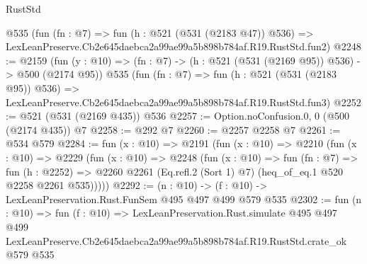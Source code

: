 \begin{lexlean}{RustStd}
\begin{coremodule}
    @535
    (fun (fn : @7) =>
    fun (h : @521 (@531 (@2183 @47)) @536) =>
    LexLeanPreserve.Cb2e645daebca2a99ae99a5b898b784af.R19.RustStd.fun2)
@2248 := @2159
    (fun (y : @10) => (fn : @7) -> (h : @521 (@531 (@2169 @95)) @536) -> @500 (@2174 @95))
    @535
    (fun (fn : @7) =>
    fun (h : @521 (@531 (@2183 @95)) @536) =>
    LexLeanPreserve.Cb2e645daebca2a99ae99a5b898b784af.R19.RustStd.fun3)
@2252 := @521 (@531 (@2169 @435)) @536
@2257 := Option.noConfusion.{0, 0} (@500 (@2174 @435)) @7
@2258 := @292 @7
@2260 := @2257 @2258 @7
@2261 := @534 @579
@2284 := fun (x : @10) =>
  @2191
    (fun (x : @10) =>
    @2210
      (fun (x : @10) =>
      @2229
        (fun (x : @10) =>
        @2248
          (fun (x : @10) =>
          fun (fn : @7) =>
          fun (h : @2252) =>
          @2260 @2261 (Eq.refl.{2} (Sort 1) @7) (heq_of_eq.{1} @520 @2258 @2261 @535)))))
@2292 := (n : @10) -> (f : @10) -> LexLeanPreservation.Rust.FunSem @495 @497 @499 @579 @535
@2302 := fun (n : @10) =>
  fun (f : @10) =>
  LexLeanPreservation.Rust.simulate
    @495
    @497
    @499
    LexLeanPreserve.Cb2e645daebca2a99ae99a5b898b784af.R19.RustStd.crate_ok
    @579
    @535
\end{coremodule}
\end{lexlean}
